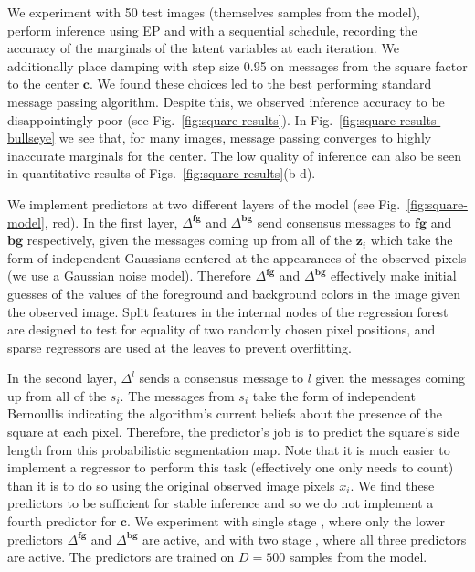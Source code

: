 We experiment with 50 test images (themselves samples from the model), perform inference using EP and with a sequential schedule, recording the accuracy of the marginals of the latent variables at each iteration. We additionally place damping with step size 0.95 on messages from the square factor to the center $\mathbf{c}$. We found these choices led to the best performing standard message passing algorithm. Despite this, we observed inference accuracy to be disappointingly poor (see Fig.~\ref{fig:square-results}). In Fig.~\ref{fig:square-results-bullseye} we see that, for many images, message passing converges to highly inaccurate marginals for the center. The low quality of inference can also be seen in quantitative results of Figs.~\ref{fig:square-results}(b-d).

We implement \MTD predictors at two different layers of the model (see Fig.~\ref{fig:square-model}, red). In the first layer, $\Delta^\mathrm{\mathbf{fg}}$ and $\Delta^\mathrm{\mathbf{bg}}$ send consensus messages to $\mathrm{\mathbf{fg}}$ and $\mathrm{\mathbf{bg}}$ respectively, given the messages coming up from all of the $\mathbf{z}_i$ which take the form of independent Gaussians centered at the appearances of the observed pixels (we use a Gaussian noise model). Therefore $\Delta^\mathrm{\mathbf{fg}}$ and $\Delta^\mathrm{\mathbf{bg}}$ effectively make initial guesses of the values of the foreground and background colors in the image given the observed image. Split features in the internal nodes of the regression forest are designed to test for equality of two randomly chosen pixel positions, and sparse regressors are used at the leaves to prevent overfitting.

In the second layer, $\Delta^l$ sends a consensus message to $l$ given the messages coming up from all of the $s_i$. The messages from $s_i$ take the form of independent Bernoullis indicating the algorithm's current beliefs about the presence of the square at each pixel. Therefore, the predictor's job is to predict the square's side length from this probabilistic segmentation map. Note that it is much easier to implement a regressor to perform this task (effectively one only needs to count) than it is to do so using the original observed image pixels $x_i$. We find these predictors to be sufficient for stable inference and so we do not implement a fourth predictor for $\mathbf{c}$. We experiment with single stage \MTD, where only the lower predictors $\Delta^\mathrm{\mathbf{fg}}$ and $\Delta^\mathrm{\mathbf{bg}}$ are active, and with two stage \MTD, where all three predictors are active. The predictors are trained on $D=500$ samples from the model.

